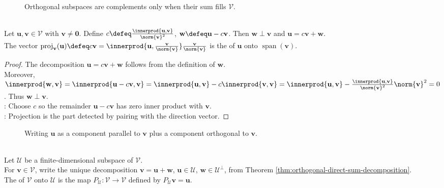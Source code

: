 \begin{figure}[H]
  \centering
  
  \caption{Orthogonal subspaces are complements only when their sum fills $\mathcal{V}$.}
  \label{fig:orthogonal-subspaces-vs-complements}
\end{figure}

\begin{proposition} \label{prop:orthogonal-projection-onto-line}\label{prop:orthogonal-decomposition-one-vector} \\
Let $\mathbf{u},\mathbf{v}\in\mathcal{V}$ with $\mathbf{v}\neq\mathbf{0}$. Define $c\defeq\frac{\innerprod{\mathbf{u},\mathbf{v}}}{\norm{\mathbf{v}}^2}$, $\mathbf{w}\defeq\mathbf{u}-c\mathbf{v}$. Then $\mathbf{w}\perp\mathbf{v}$ and $\mathbf{u}=c\mathbf{v}+\mathbf{w}$.\\
The vector $\operatorname{proj}_{\mathbf{v}}(\mathbf{u})\defeq c\mathbf{v} =\innerprod{\mathbf{u},\frac{\mathbf{v}}{\norm{\mathbf{v}}}}\frac{\mathbf{v}}{\norm{\mathbf{v}}}$ is the  of $\mathbf{u}$ onto $\operatorname{span}(\mathbf{v})$.
\begin{proof}
The decomposition $\mathbf{u}=c\mathbf{v}+\mathbf{w}$ follows from the definition of $\mathbf{w}$.\\
Moreover, $\innerprod{\mathbf{w},\mathbf{v}} =\innerprod{\mathbf{u}-c\mathbf{v},\mathbf{v}} =\innerprod{\mathbf{u},\mathbf{v}}-c\innerprod{\mathbf{v},\mathbf{v}} =\innerprod{\mathbf{u},\mathbf{v}} -\frac{\innerprod{\mathbf{u},\mathbf{v}}}{\norm{\mathbf{v}}^2}\norm{\mathbf{v}}^2 =0$. Thus $\mathbf{w}\perp\mathbf{v}$.\\
: Choose $c$ so the remainder $\mathbf{u}-c\mathbf{v}$ has zero inner product with $\mathbf{v}$.\\
: Projection is the part detected by pairing with the direction vector.
\end{proof}
\end{proposition}

\begin{figure}[H]
  \centering
  
  \caption{Writing $\mathbf{u}$ as a component parallel to $\mathbf{v}$ plus a component orthogonal to $\mathbf{v}$.}
  \label{fig:orthogonal-decomposition-one-vector}
\end{figure}

\begin{definition} \label{def:orthogonal-projection-subspace} \\
Let $\mathcal{U}$ be a finite-dimensional subspace of $\mathcal{V}$.\\
For $\mathbf{v}\in\mathcal{V}$, write the unique decomposition $\mathbf{v}=\mathbf{u}+\mathbf{w}$, $\mathbf{u}\in\mathcal{U}$, $\mathbf{w}\in\mathcal{U}^{\perp}$, from Theorem \ref{thm:orthogonal-direct-sum-decomposition}.\\
The  of $\mathcal{V}$ onto $\mathcal{U}$ is the map $P_{\mathcal{U}}:\mathcal{V}\to\mathcal{V}$ defined by $P_{\mathcal{U}}\mathbf{v}=\mathbf{u}$.
\end{definition}

